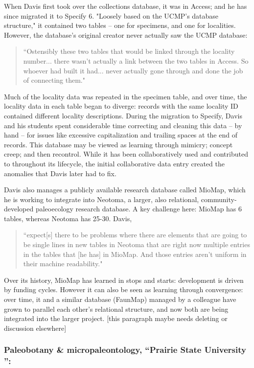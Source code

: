 When Davis first took over the collections database, it was in Access; and he has since migrated it to Specify 6. "Loosely based on the UCMP's database structure," it contained two tables – one for specimens, and one for localities. However, the database’s original creator never actually saw the UCMP database:
\begin{quote}
“Ostensibly these two tables that would be linked through the locality number... there wasn't actually a link between the two tables in Access. So whoever had built it had... never actually gone through and done the job of connecting them."
\end{quote}
Much of the locality data was repeated in the specimen table, and over time, the locality data in each table began to diverge: records with the same locality ID contained different locality descriptions. During the migration to Specify, Davis and his students spent considerable time correcting and cleaning this data – by hand – for issues like excessive capitalization and trailing spaces at the end of records.  This database may be viewed as learning through mimicry; concept creep; and then recontrol. While it has been collaboratively used and contributed to throughout its lifecycle, the initial collaborative data entry created the anomalies that Davis later had to fix.

Davis also manages a publicly available research database called MioMap, which he is working to integrate into Neotoma, a larger, also relational, community-developed paleoecology research database. A key challenge here: MioMap has 6 tables, whereas Neotoma has 25-30. Davis, 
\begin{quote}
“expect[s] there to be problems where there are elements that are going to be single lines in new tables in Neotoma that are right now multiple entries in the tables that [he has] in MioMap. And those entries aren't uniform in their machine readability."  
\end{quote}
Over its history, MioMap has learned in stops and starts: development is driven by funding cycles. However it can also be seen as learning through convergence: over time, it and a similar database (FaunMap) managed by a colleague have grown to parallel each other's relational structure, and now both are being integrated into the larger project. [this paragraph maybe needs deleting or discussion elsewhere]

\subsubsection{Paleobotany & micropaleontology, “Prairie State University ”:}

